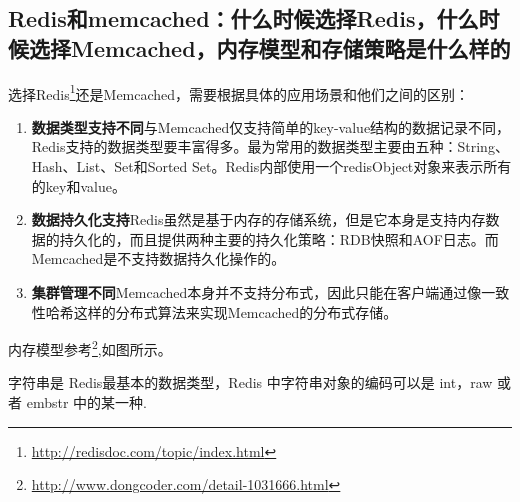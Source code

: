 \documentclass[../../../interview-questions.tex]{subfiles}
\begin{document}
\subsection{Redis和memcached：什么时候选择Redis，什么时候选择Memcached，内存模型和存储策略是什么样的}

选择Redis\footnote{\url{http://redisdoc.com/topic/index.html}}还是Memcached，需要根据具体的应用场景和他们之间的区别：

\begin{enumerate}
\item {\textbf{数据类型支持不同}}与Memcached仅支持简单的key-value结构的数据记录不同，Redis支持的数据类型要丰富得多。最为常用的数据类型主要由五种：String、Hash、List、Set和Sorted Set。Redis内部使用一个redisObject对象来表示所有的key和value。
\item {\textbf{数据持久化支持}}Redis虽然是基于内存的存储系统，但是它本身是支持内存数据的持久化的，而且提供两种主要的持久化策略：RDB快照和AOF日志。而Memcached是不支持数据持久化操作的。
\item {\textbf{集群管理不同}}Memcached本身并不支持分布式，因此只能在客户端通过像一致性哈希这样的分布式算法来实现Memcached的分布式存储。
\end{enumerate}                                  

内存模型参考\footnote{\url{http://www.dongcoder.com/detail-1031666.html}},如图所示。

字符串是 Redis最基本的数据类型，Redis 中字符串对象的编码可以是 int，raw 或者 embstr 中的某一种.
\end{document}
